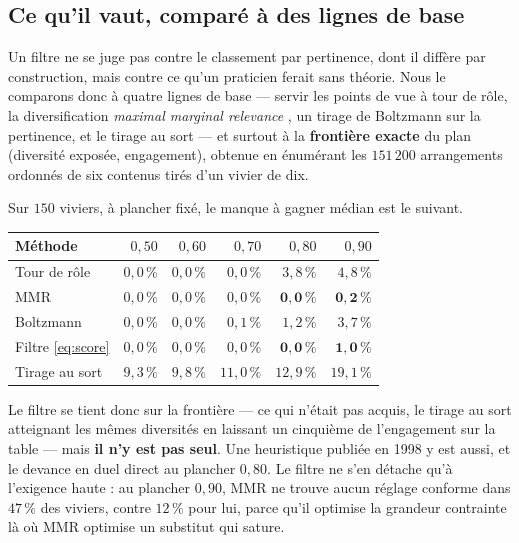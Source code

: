 \documentclass[11pt,a4paper]{article}
\begin{document}
\subsection{Ce qu'il vaut, comparé à des lignes de base}
\label{sec:lignesdebase}

Un filtre ne se juge pas contre le classement par pertinence, dont il diffère par construction,
mais contre ce qu'un praticien ferait sans théorie. Nous le comparons donc à quatre lignes de
base --- servir les points de vue à tour de rôle, la diversification \emph{maximal marginal
relevance} \citep{carbonell1998}, un tirage de Boltzmann sur la pertinence, et le tirage au sort
--- et surtout à la \textbf{frontière exacte} du plan (diversité exposée, engagement), obtenue
en énumérant les $151\,200$ arrangements ordonnés de six contenus tirés d'un vivier de dix.

Sur $150$ viviers, à plancher fixé, le manque à gagner médian est le suivant.

\begin{center}
\begin{tabular}{@{}lrrrrr@{}}
\toprule
\textbf{Méthode} & $0{,}50$ & $0{,}60$ & $0{,}70$ & $0{,}80$ & $0{,}90$ \\
\midrule
Tour de rôle & $0{,}0\,\%$ & $0{,}0\,\%$ & $0{,}0\,\%$ & $3{,}8\,\%$ & $4{,}8\,\%$ \\
MMR & $0{,}0\,\%$ & $0{,}0\,\%$ & $0{,}0\,\%$ & $\mathbf{0{,}0\,\%}$ & $\mathbf{0{,}2\,\%}$ \\
Boltzmann & $0{,}0\,\%$ & $0{,}0\,\%$ & $0{,}1\,\%$ & $1{,}2\,\%$ & $3{,}7\,\%$ \\
Filtre \eqref{eq:score} & $0{,}0\,\%$ & $0{,}0\,\%$ & $0{,}0\,\%$ & $\mathbf{0{,}0\,\%}$ & $\mathbf{1{,}0\,\%}$ \\
Tirage au sort & $9{,}3\,\%$ & $9{,}8\,\%$ & $11{,}0\,\%$ & $12{,}9\,\%$ & $19{,}1\,\%$ \\
\bottomrule
\end{tabular}
\end{center}

Le filtre se tient donc sur la frontière --- ce qui n'était pas acquis, le tirage au sort
atteignant les mêmes diversités en laissant un cinquième de l'engagement sur la table --- mais
\textbf{il n'y est pas seul}. Une heuristique publiée en 1998 y est aussi, et le devance en duel
direct au plancher $0{,}80$. Le filtre ne s'en détache qu'à l'exigence haute : au plancher
$0{,}90$, MMR ne trouve aucun réglage conforme dans $47\,\%$ des viviers, contre $12\,\%$ pour
lui, parce qu'il optimise la grandeur contrainte là où MMR optimise un substitut qui sature.
\end{document}

